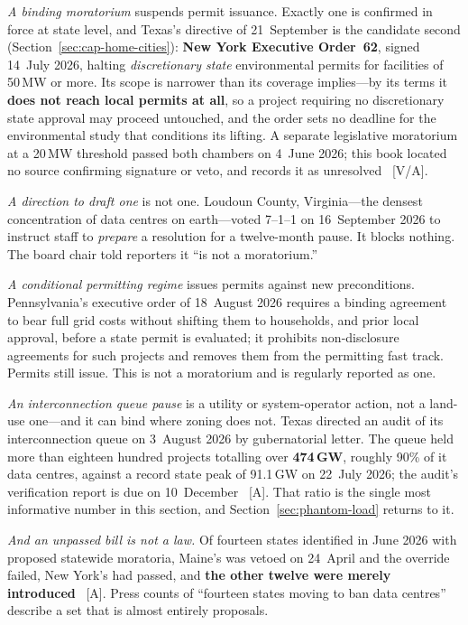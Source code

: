 \emph{A binding moratorium} suspends permit issuance. Exactly one is confirmed in force at state level, and Texas's directive of 21~September is the candidate second (Section~\ref{sec:cap-home-cities}): \textbf{New York Executive Order~62}, signed 14~July 2026, halting \emph{discretionary state} environmental permits for facilities of 50\,MW or more. Its scope is narrower than its coverage implies---by its terms it \textbf{does not reach local permits at all}, so a project requiring no discretionary state approval may proceed untouched, and the order sets no deadline for the environmental study that conditions its lifting. A separate legislative moratorium at a 20\,MW threshold passed both chambers on 4~June 2026; this book located no source confirming signature or veto, and records it as unresolved~\cite{moratorium-taxonomy} [V/A].

\emph{A direction to draft one} is not one. Loudoun County, Virginia---the densest concentration of data centres on earth---voted 7--1--1 on 16~September 2026 to instruct staff to \emph{prepare} a resolution for a twelve-month pause. It blocks nothing. The board chair told reporters it ``is not a moratorium.''

\emph{A conditional permitting regime} issues permits against new preconditions. Pennsylvania's executive order of 18~August 2026 requires a binding agreement to bear full grid costs without shifting them to households, and prior local approval, before a state permit is evaluated; it prohibits non-disclosure agreements for such projects and removes them from the permitting fast track. Permits still issue. This is not a moratorium and is regularly reported as one.

\emph{An interconnection queue pause} is a utility or system-operator action, not a land-use one---and it can bind where zoning does not. Texas directed an audit of its interconnection queue on 3~August 2026 by gubernatorial letter. The queue held more than eighteen hundred projects totalling over \textbf{474\,GW}, roughly 90\% of it data centres, against a record state peak of 91.1\,GW on 22~July 2026; the audit's verification report is due on 10~December~\cite{cap-ercot-audit} [A]. That ratio is the single most informative number in this section, and Section~\ref{sec:phantom-load} returns to it.

\emph{And an unpassed bill is not a law.} Of fourteen states identified in June 2026 with proposed statewide moratoria, Maine's was vetoed on 24~April and the override failed, New York's had passed, and \textbf{the other twelve were merely introduced}~\cite{moratorium-taxonomy} [A]. Press counts of ``fourteen states moving to ban data centres'' describe a set that is almost entirely proposals.

